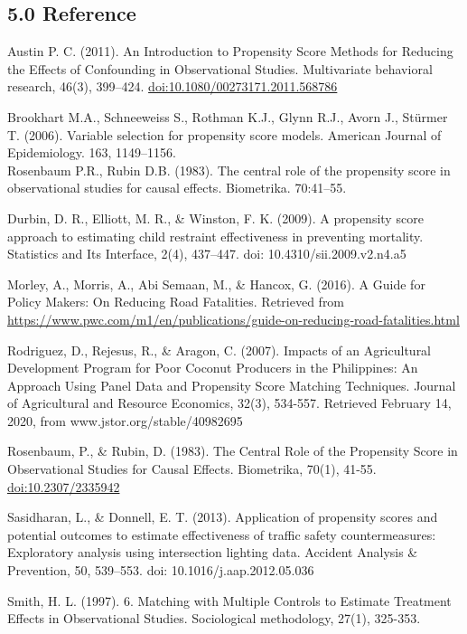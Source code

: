 \documentclass[]{article}
\begin{document}
\hypertarget{reference}{%
\subsection{5.0 Reference}\label{reference}}

Austin P. C. (2011). An Introduction to Propensity Score Methods for
Reducing the Effects of Confounding in Observational Studies.
Multivariate behavioral research, 46(3), 399--424.
\url{doi:10.1080/00273171.2011.568786}

Brookhart M.A., Schneeweiss S., Rothman K.J., Glynn R.J., Avorn J.,
Stürmer T. (2006). Variable selection for propensity score models.
American Journal of Epidemiology. 163, 1149--1156.\\
Rosenbaum P.R., Rubin D.B. (1983). The central role of the propensity
score in observational studies for causal effects. Biometrika.
70:41--55.

Durbin, D. R., Elliott, M. R., \& Winston, F. K. (2009). A propensity
score approach to estimating child restraint effectiveness in preventing
mortality. Statistics and Its Interface, 2(4), 437--447. doi:
10.4310/sii.2009.v2.n4.a5

Morley, A., Morris, A., Abi Semaan, M., \& Hancox, G. (2016). A Guide
for Policy Makers: On Reducing Road Fatalities. Retrieved from
\url{https://www.pwc.com/m1/en/publications/guide-on-reducing-road-fatalities.html}

Rodriguez, D., Rejesus, R., \& Aragon, C. (2007). Impacts of an
Agricultural Development Program for Poor Coconut Producers in the
Philippines: An Approach Using Panel Data and Propensity Score Matching
Techniques. Journal of Agricultural and Resource Economics, 32(3),
534-557. Retrieved February 14, 2020, from www.jstor.org/stable/40982695

Rosenbaum, P., \& Rubin, D. (1983). The Central Role of the Propensity
Score in Observational Studies for Causal Effects. Biometrika, 70(1),
41-55. \url{doi:10.2307/2335942}

Sasidharan, L., \& Donnell, E. T. (2013). Application of propensity
scores and potential outcomes to estimate effectiveness of traffic
safety countermeasures: Exploratory analysis using intersection lighting
data. Accident Analysis \& Prevention, 50, 539--553. doi:
10.1016/j.aap.2012.05.036

Smith, H. L. (1997). 6. Matching with Multiple Controls to Estimate
Treatment Effects in Observational Studies. Sociological methodology,
27(1), 325-353.
\end{document}
